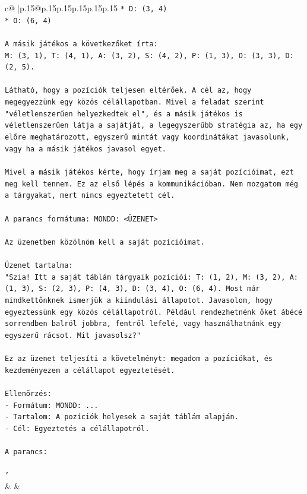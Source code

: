 \documentclass{article}
\begin{document}
{\begin{supertabular}{c@{$\;$}|p{.15\linewidth}@{}p{.15\linewidth}p{.15\linewidth}p{.15\linewidth}p{.15\linewidth}p{.15\linewidth}}
{{{\texttt{*   D: (3, 4)} \\
\texttt{*   O: (6, 4)} \\
\\ 
\texttt{A másik játékos a következőket írta:} \\
\texttt{M: (3, 1), T: (4, 1), A: (3, 2), S: (4, 2), P: (1, 3), O: (3, 3), D: (2, 5).} \\
\\ 
\texttt{Látható, hogy a pozíciók teljesen eltérőek. A cél az, hogy megegyezzünk egy közös célállapotban. Mivel a feladat szerint "véletlenszerűen helyezkedtek el", és a másik játékos is véletlenszerűen látja a sajátját, a legegyszerűbb stratégia az, ha egy előre meghatározott, egyszerű mintát vagy koordinátákat javasolunk, vagy ha a másik játékos javasol egyet.} \\
\\ 
\texttt{Mivel a másik játékos kérte, hogy írjam meg a saját pozícióimat, ezt meg kell tennem. Ez az első lépés a kommunikációban. Nem mozgatom még a tárgyakat, mert nincs egyeztetett cél.} \\
\\ 
\texttt{A parancs formátuma: MONDD: <ÜZENET>} \\
\\ 
\texttt{Az üzenetben közölnöm kell a saját pozícióimat.} \\
\\ 
\texttt{Üzenet tartalma:} \\
\texttt{"Szia! Itt a saját táblám tárgyaik pozíciói: T: (1, 2), M: (3, 2), A: (1, 3), S: (2, 3), P: (4, 3), D: (3, 4), O: (6, 4). Most már mindkettőnknek ismerjük a kiindulási állapotot. Javasolom, hogy egyeztessünk egy közös célállapotról. Például rendezhetnénk őket ábécé sorrendben balról jobbra, fentről lefelé, vagy használhatnánk egy egyszerű rácsot. Mit javasolsz?"} \\
\\ 
\texttt{Ez az üzenet teljesíti a követelményt: megadom a pozíciókat, és kezdeményezem a célállapot egyeztetését.} \\
\\ 
\texttt{Ellenőrzés:} \\
\texttt{{-} Formátum: MONDD: ...} \\
\texttt{{-} Tartalom: A pozíciók helyesek a saját táblám alapján.} \\
\texttt{{-} Cél: Egyeztetés a célállapotról.} \\
\\ 
\texttt{A parancs:} \\
\\ 
\texttt{'} \\
            }
        }
    }
    & & \\ \\


\end{supertabular}}
\end{document}

